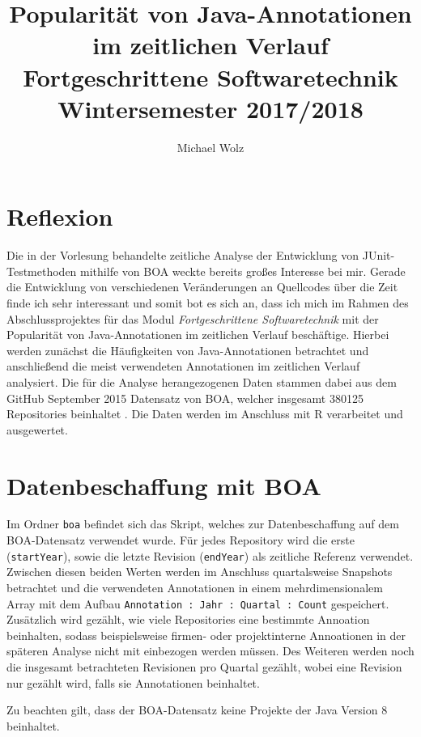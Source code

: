 \documentclass[11pt,a4paper,parskip=full]{scrartcl}
\author{Michael Wolz}
\title{Popularität von Java-Annotationen im zeitlichen Verlauf\\\Large{Fortgeschrittene Softwaretechnik}\\ \large{Wintersemester 2017/2018}}
\begin{document}
\maketitle

\section{Reflexion}

Die in der Vorlesung behandelte zeitliche Analyse der Entwicklung von JUnit-Testmetho\-den mithilfe von BOA weckte bereits großes Interesse bei mir. Gerade die Entwicklung von verschiedenen Veränderungen an Quellcodes über die Zeit finde ich sehr interessant und somit bot es sich an, dass ich mich im Rahmen des Abschlussprojektes für das Modul \textit{Fortgeschrittene Softwaretechnik} mit der Popularität von Java-Annotationen im zeitlichen Verlauf beschäftige. Hierbei werden zunächst die Häufigkeiten von Java-Annotationen betrachtet und anschließend die meist verwendeten Annotationen im zeitlichen Verlauf analysiert. Die für die Analyse herangezogenen Daten stammen dabei aus dem GitHub September 2015 Datensatz von BOA, welcher insgesamt 380125 Repositories beinhaltet \cite{boadatasetstats}. Die Daten werden im Anschluss mit R verarbeitet und ausgewertet.

\section{Datenbeschaffung mit BOA}

Im Ordner \texttt{boa} befindet sich das Skript, welches zur Datenbeschaffung auf dem BOA-Datensatz verwendet wurde. Für jedes Repository wird die erste (\texttt{startYear}), sowie die letzte Revision (\texttt{endYear}) als zeitliche Referenz verwendet. Zwischen diesen beiden Werten werden im Anschluss quartalsweise Snapshots betrachtet und die verwendeten Annotationen in einem mehrdimensionalem Array mit dem Aufbau \texttt{Annotation : Jahr : Quartal : Count} gespeichert. Zusätzlich wird gezählt, wie viele Repositories eine bestimmte Annoation beinhalten, sodass beispielsweise firmen- oder projektinterne Annoationen in der späteren Analyse nicht mit einbezogen werden müssen. Des Weiteren werden noch die insgesamt betrachteten Revisionen pro Quartal gezählt, wobei eine Revision nur gezählt wird, falls sie Annotationen beinhaltet. \par

Zu beachten gilt, dass der BOA-Datensatz keine Projekte der Java Version 8 beinhaltet. \cite{boadatasetstats} 
\end{document}

